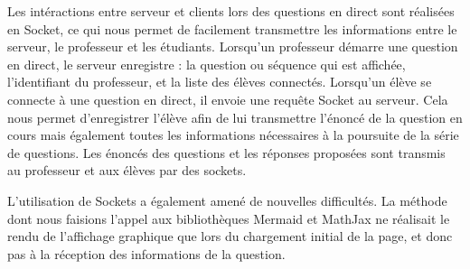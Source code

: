\documentclass[a4paper, 12pt]{article}
\begin{document}
Les intéractions entre serveur et clients lors des questions en direct sont réalisées en Socket, ce qui nous permet de facilement transmettre les informations entre le serveur, le professeur et les étudiants. Lorsqu'un professeur démarre une question en direct, le serveur enregistre : la question ou séquence qui est affichée, l'identifiant du professeur, et la liste des élèves connectés. Lorsqu'un élève se connecte à une question en direct, il envoie une requête Socket au serveur. Cela nous permet d'enregistrer l'élève afin de lui transmettre l'énoncé de la question en cours mais également toutes les informations nécessaires à la poursuite de la série de questions.
Les énoncés des questions et les réponses proposées sont transmis au professeur et aux élèves par des sockets. 


L'utilisation de Sockets a également amené de nouvelles difficultés. La méthode dont nous faisions l'appel aux bibliothèques Mermaid et MathJax ne réalisait le rendu de l'affichage graphique que lors du chargement initial de la page, et donc pas à la réception des informations de la question.
\end{document}
